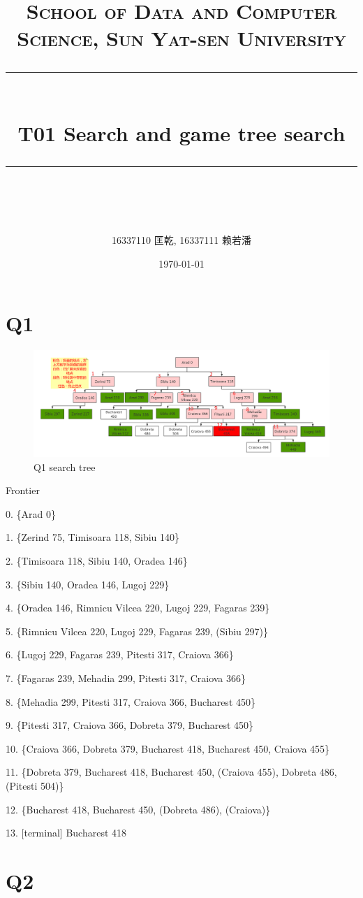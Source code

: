 \documentclass[a4paper, 11pt]{article}
\title{	
\normalfont \normalsize
\textsc{School of Data and Computer Science, Sun Yat-sen University} \\ [25pt] %
\rule{\textwidth}{0.5pt} \\[0.4cm] %
\huge  T01 Search and game tree search\\ %
\rule{\textwidth}{2pt} \\[0.5cm] %
\author{16337110 匡乾, 16337111 赖若潘}
\date{\normalsize\today}
}
\begin{document}
\maketitle
\tableofcontents
\newpage
\section{Q1}
\begin{figure}
  \centering
  \includegraphics[width=15cm]{0.png}
  \caption{Q1 search tree}
\end{figure}

Frontier

0. \{Arad 0\}

1. \{Zerind 75, Timisoara 118, Sibiu 140\}

2. \{Timisoara 118, Sibiu 140, Oradea 146\}

3. \{Sibiu 140, Oradea 146, Lugoj 229\}

4. \{Oradea 146, Rimnicu Vilcea 220, Lugoj 229, Fagaras 239\}

5. \{Rimnicu Vilcea 220, Lugoj 229, Fagaras 239, (Sibiu 297)\}

6. \{Lugoj 229, Fagaras 239, Pitesti 317, Craiova 366\}

7. \{Fagaras 239, Mehadia 299, Pitesti 317, Craiova 366\}

8. \{Mehadia 299, Pitesti 317, Craiova 366, Bucharest 450\}

9. \{Pitesti 317, Craiova 366, Dobreta 379, Bucharest 450\}

10. \{Craiova 366, Dobreta 379, Bucharest 418, Bucharest 450, Craiova 455\}

11. \{Dobreta 379, Bucharest 418, Bucharest 450, (Craiova 455), Dobreta 486, (Pitesti 504)\}

12. \{Bucharest 418, Bucharest 450, (Dobreta 486), (Craiova)\}

13. [terminal] Bucharest 418

\section{Q2}
\end{document}
